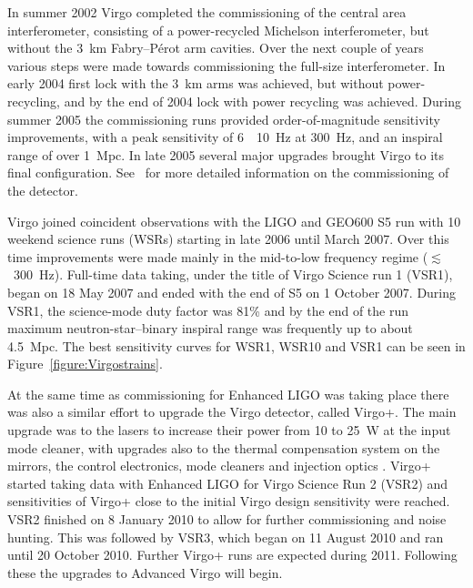 \documentclass{article}
\newcommand{\Hz}{Hz\super{-1/2}\xspace}
\begin{document}
In summer 2002 Virgo completed the commissioning of the central area
interferometer, consisting of a power-recycled Michelson interferometer, but
without the 3~km Fabry--P\'{e}rot arm cavities. Over the next couple of years
various steps were made towards commissioning the full-size interferometer. In
early 2004 first lock with the 3~km arms was achieved, but without
power-recycling, and by the end of 2004 lock with power recycling was achieved.
During summer 2005 the commissioning runs provided order-of-magnitude
sensitivity improvements, with a peak sensitivity of
6~\texttimes~10~\Hz at 300~Hz, and an inspiral range
of over 1~Mpc. In late 2005 several major upgrades brought Virgo to
its final configuration. See~\cite{Acernese:2004, Acernese:2005,
  Acernese:2006, Acernese:2007} for more detailed information on the
commissioning of the detector.

Virgo joined coincident observations with the LIGO and GEO600 S5 run with 10
weekend science runs (WSRs) starting in late 2006 until March 2007. Over this
time improvements were made mainly in the mid-to-low frequency regime
($\lesssim$~300~Hz). Full-time data taking, under the title of Virgo
Science run 1 (VSR1), began on 18 May 2007 and ended with the end of
S5 on 1 October 2007. During VSR1, the science-mode duty factor was
81\% and by the end of the run maximum neutron-star--binary inspiral
range was frequently up to about 4.5~Mpc. The best sensitivity curves
for WSR1, WSR10 and VSR1 can be seen in Figure~\ref{figure:Virgostrains}.

At the same time as commissioning for Enhanced LIGO was taking place there was
also a similar effort to upgrade the Virgo detector, called Virgo+. The main
upgrade was to the lasers to increase their power from 10 to 25~W at the input
mode cleaner, with upgrades also to the thermal compensation system on the
mirrors, the control electronics, mode cleaners and injection optics
\cite{Acernese:2008b, AdvVirgoWhitepaper}. Virgo+ started taking data
with Enhanced LIGO for Virgo Science Run 2 (VSR2) and sensitivities of
Virgo+ close to the initial Virgo design sensitivity were
reached. VSR2 finished on 8 January 2010 to allow for further
commissioning and noise hunting. This was followed by VSR3, which
began on 11 August 2010 and ran until 20 October 2010. Further Virgo+
runs are expected during 2011. Following these the upgrades to
Advanced Virgo will begin.
\end{document}
